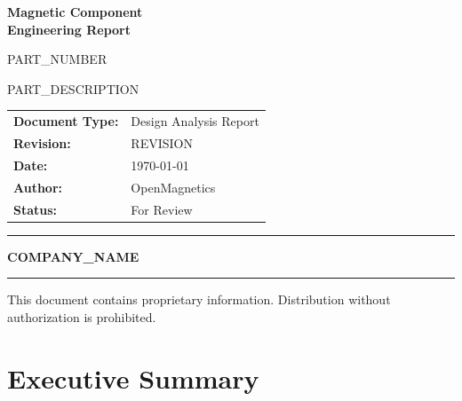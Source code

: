 \documentclass[11pt,a4paper]{article}
\begin{document}
\begin{titlepage}
\centering
\vspace*{2cm}

{\Huge\bfseries Magnetic Component\\Engineering Report}

\vspace{1cm}

{\LARGE {{PART_NUMBER}}}

\vspace{0.5cm}

{\Large {{PART_DESCRIPTION}}}

\vspace{2cm}

\begin{tabular}{ll}
\textbf{Document Type:} & Design Analysis Report \\
\textbf{Revision:} & {{REVISION}} \\
\textbf{Date:} & \today \\
\textbf{Author:} & OpenMagnetics \\
\textbf{Status:} & For Review \\
\end{tabular}

\vspace{2cm}

\hrule
\vspace{0.5cm}
{\large\textbf{{{COMPANY_NAME}}}}
\vspace{0.5cm}
\hrule

\vfill

{\footnotesize This document contains proprietary information. Distribution without authorization is prohibited.}
\end{titlepage}

\tableofcontents
\newpage

\section{Executive Summary}
\end{document}

